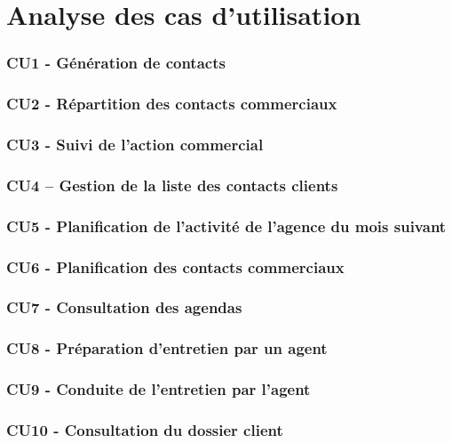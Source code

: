 \part{Analyse des cas d'utilisation}
\setcounter{section}{0}

\section{CU1 - Génération de contacts}

\section{CU2 - Répartition des contacts commerciaux}

\section{CU3 - Suivi de l’action commercial}

\section{CU4 – Gestion de la liste des contacts clients}

\section{CU5 - Planification de l’activité de l’agence du mois suivant}

\section{CU6 - Planification des contacts commerciaux}

\section{CU7 - Consultation des agendas}

\section{CU8 - Préparation d’entretien par un agent}

\section{CU9 - Conduite de l’entretien par l’agent}

\section{CU10 - Consultation du dossier client}